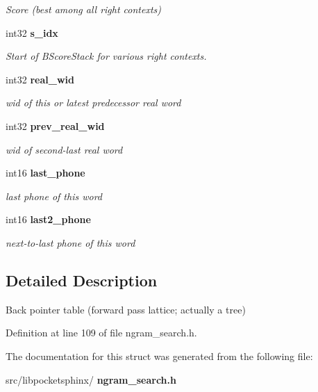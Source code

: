 \begin{DoxyCompactItemize}
\begin{DoxyCompactList}\small\item\em Score (best among all right contexts) \end{DoxyCompactList}\item 
\mbox{\label{structbptbl__s_abf9e4bcf1927aa09fb2b30c59e99f551}} 
int32 \textbf{ s\+\_\+idx}
\begin{DoxyCompactList}\small\item\em Start of B\+Score\+Stack for various right contexts. \end{DoxyCompactList}\item 
\mbox{\label{structbptbl__s_a91247e4f807cf780afe8f5ac45e720b8}} 
int32 \textbf{ real\+\_\+wid}
\begin{DoxyCompactList}\small\item\em wid of this or latest predecessor real word \end{DoxyCompactList}\item 
\mbox{\label{structbptbl__s_a83784e3b0121bc365d485151ab277920}} 
int32 \textbf{ prev\+\_\+real\+\_\+wid}
\begin{DoxyCompactList}\small\item\em wid of second-\/last real word \end{DoxyCompactList}\item 
\mbox{\label{structbptbl__s_aa7704ba76d3dcde6b8a24855362a4289}} 
int16 \textbf{ last\+\_\+phone}
\begin{DoxyCompactList}\small\item\em last phone of this word \end{DoxyCompactList}\item 
\mbox{\label{structbptbl__s_a27b8e54bb7552e6afc15e4f44f42e3b7}} 
int16 \textbf{ last2\+\_\+phone}
\begin{DoxyCompactList}\small\item\em next-\/to-\/last phone of this word \end{DoxyCompactList}\end{DoxyCompactItemize}


\subsection{Detailed Description}
Back pointer table (forward pass lattice; actually a tree) 

Definition at line 109 of file ngram\+\_\+search.\+h.



The documentation for this struct was generated from the following file\+:\begin{DoxyCompactItemize}
\item 
src/libpocketsphinx/\textbf{ ngram\+\_\+search.\+h}\end{DoxyCompactItemize}
